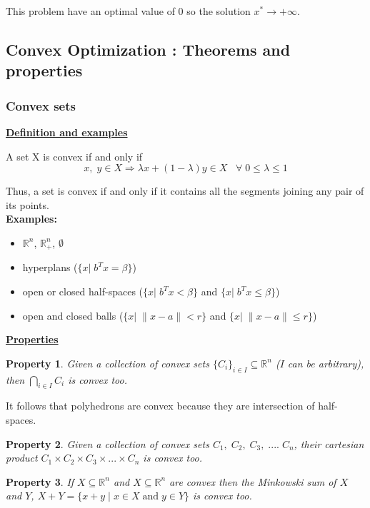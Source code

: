 \documentclass{article}
\begin{document}
This problem have an optimal value of 0 so the solution $x^{*} \rightarrow + \infty$. 

\subsection{Convex Optimization : Theorems and properties}
\subsubsection{Convex sets}
\underline{\textbf{Definition and examples}}

\begin{mydef}
A set X is convex if and only if
$$x,\;y \in X \Rightarrow \lambda x +(1-\lambda )y \in X \;\;\; \forall \; 0 \le \lambda \le 1$$
\end{mydef}

Thus, a set is convex if and only if it contains all the segments joining any pair of its points. \\

\textbf{Examples:}
\begin{itemize}
\item $\mathbb{R}^n$, $\mathbb{R}^n_+$, $\emptyset$
\item hyperplans ($\{x|\; b^Tx=\beta\}$)
\item open or closed half-spaces ($\{x|\;b^Tx<\beta\}$ and $\{x| \;b^Tx\le \beta\}$)
\item open and closed balls ($\{x|\;\|x-a\|<r\}$ and $\{x|\;\|x-a\|\leq r \}$)
\end{itemize}

\underline{\textbf{Properties}}
\newtheorem{myproperty}{Property}
\begin{myproperty}
Given a collection of convex sets $\{C_i\}_{i \in I} \subseteq \mathbb{R}^n$ ($I$ can be arbitrary), then $\bigcap \limits _{i \in I}C_i$ is convex too.
\end{myproperty}
It follows that polyhedrons are convex because they are intersection of half-spaces.\\

\begin{myproperty}
Given a collection of convex sets $C_1,\; C_2,\; C_3,\; ....\;C_n$, their cartesian product $C_1\times C_2 \times C_3 \times ... \times C_n$ is convex too. 
\end{myproperty}

\begin{myproperty}
If $X\subseteq \mathbb{R}^n$ and $X\subseteq \mathbb{R}^n$ are convex then the Minkowski sum of $X$ and $Y$, $X+Y=\{x+y\;|\;x \in X \;\text{and} \; y \in Y\}$ is convex too. 
\end{myproperty}
\end{document}

